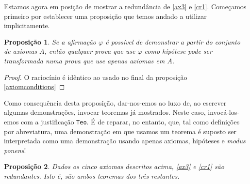 \documentclass{report}
\newtheorem{prop}{Proposição}
\theoremstyle{definition}
\theoremstyle{remark}
\begin{document}
	Estamos agora em posição de mostrar a redundância de \eqref{ax3} e \eqref{cr1}. Começamos primeiro por establecer uma proposição que temos andado a utilizar implicitamente.
	
	\begin{prop}
	Se a afirmação $\varphi$ é possível de demonstrar a partir do conjunto de axiomas $A$, então qualquer prova que use $\varphi$ como hipótese pode ser transformada numa prova que use apenas axiomas em $A$.
	\end{prop}
	
	\begin{proof}
	O raciocínio é idêntico ao usado no final da proposição \ref{axiomconditions}
	\end{proof}
	
	Como consequência desta proposição, dar-nos-emos ao luxo de, ao escrever algumas demonstrações, invocar teoremas já mostrados. Neste caso, invocá-los-emos com a justificação \texttt{Teo}. É de reparar, no entanto, que, tal como definições por abreviatura, uma demonstração em que usamos um teorema é suposto ser interpretada como uma demonstração usando apenas axiomas, hipóteses e \textit{modus ponens}!
	
	\begin{prop}
	Dados os cinco axiomas descritos acima, \eqref{ax3} e \eqref{cr1} são redundantes. Isto é, são ambos teoremas dos três restantes.
	\end{prop}
	
\end{document}
